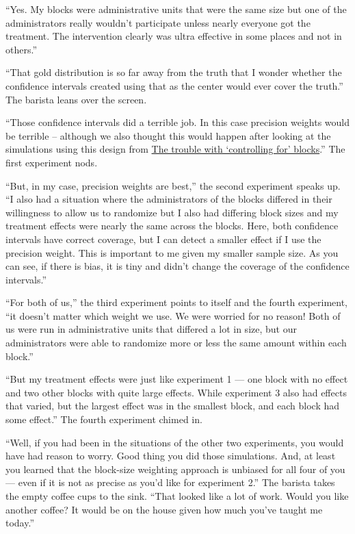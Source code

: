 \documentclass[
]{article}
\begin{document}
``Yes. My blocks were administrative units that were the same size but one of
the administrators really wouldn't participate unless nearly everyone got the
treatment. The intervention clearly was ultra effective in some places and not
in others.''

``That gold distribution is so far away from the truth that I wonder whether the
confidence intervals created using that as the center would ever cover the
truth.'' The barista leans over the screen.

``Those confidence intervals did a terrible job. In this case precision weights
would be terrible -- although we also thought this would happen after looking
at the simulations using this design from \href{https://declaredesign.org/blog/biased-fixed-effects.html}{The trouble with `controlling for'
blocks}.'' The first
experiment nods.

``But, in my case, precision weights are best,'' the second experiment speaks up. ``I also
had a situation where the administrators of the blocks differed in their
willingness to allow us to randomize but I also had differing block sizes and
my treatment effects were nearly the same across the blocks. Here, both
confidence intervals have correct coverage, but I can detect a smaller effect
if I use the precision weight. This is important to me given my smaller sample
size. As you can see, if there is bias, it is tiny and didn't change the
coverage of the confidence intervals.''

``For both of us,'' the third experiment points to itself and the fourth experiment,
``it doesn't matter which weight we use. We were worried for no reason! Both of
us were run in administrative units that differed a lot in size, but our
administrators were able to randomize more or less the same amount within each
block.''

``But my treatment effects were just like experiment 1 --- one block with no
effect and two other blocks with quite large effects. While experiment 3 also
had effects that varied, but the largest effect was in the smallest block,
and each block had some effect.'' The fourth experiment chimed in.

``Well, if you had been in the situations of the other two experiments, you
would have had reason to worry. Good thing you did those simulations. And, at
least you learned that the block-size weighting approach is unbiased for all
four of you --- even if it is not as precise as you'd like for experiment 2.''
The barista takes the empty coffee cups to the sink. ``That looked like a lot
of work. Would you like another coffee? It would be on the house given how much
you've taught me today.''
\end{document}
